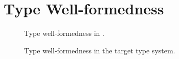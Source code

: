 \section{Type Well-formedness}

\begin{figure}[h]
\framebox{$ \judgeewf \gamma \tau $}

\begin{mathpar}






\end{mathpar}
\caption{Type well-formedness in \name.}
\end{figure}


\begin{figure}[h]

\begin{mathpar}





\end{mathpar}
\caption{Type well-formedness in the target type system.}
\end{figure}